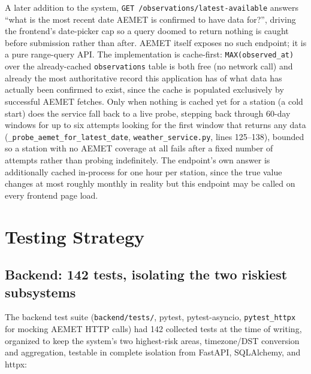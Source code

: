 \documentclass[11pt,a4paper]{article}
\begin{document}
A later addition to the system, \texttt{GET /observations/latest-available}
answers ``what is the most recent date AEMET is confirmed to have data
for?'', driving the frontend's date-picker cap so a query doomed to return
nothing is caught before submission rather than after. AEMET itself
exposes no such endpoint; it is a pure range-query API. The implementation
is cache-first: \texttt{MAX(observed\_at)} over the already-cached
\texttt{observations} table is both free (no network call) and already the
most authoritative record this application has of what data has actually
been confirmed to exist, since the cache is populated exclusively by
successful AEMET fetches. Only when nothing is cached yet for a station
(a cold start) does the service fall back to a live probe, stepping back
through 60-day windows for up to six attempts looking for the first window
that returns any data (\texttt{\_probe\_aemet\_for\_latest\_date},
\texttt{weather\_service.py}, lines 125--138), bounded so a station with no
AEMET coverage at all fails after a fixed number of attempts rather than
probing indefinitely. The endpoint's own answer is additionally cached
in-process for one hour per station, since the true value changes at most
roughly monthly in reality but this endpoint may be called on every
frontend page load.

\section{Testing Strategy}
\label{sec:testing}

\subsection{Backend: 142 tests, isolating the two riskiest subsystems}

The backend test suite (\texttt{backend/tests/}, pytest,
pytest-asyncio, \texttt{pytest\_httpx} for mocking AEMET HTTP calls) had
142 collected tests at the time of writing, organized to keep the
system's two highest-risk areas, timezone/DST conversion and aggregation,
testable in complete isolation from FastAPI, SQLAlchemy, and httpx:
\end{document}
